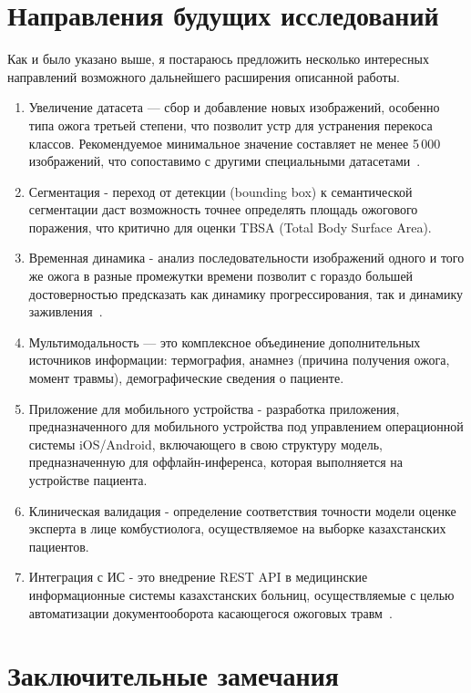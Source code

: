 \section{Направления будущих исследований}

Как и было указано выше, я постараюсь предложить несколько интересных направлений возможного дальнейшего расширения описанной работы.

\begin{enumerate}
\item Увеличение датасета --- сбор и добавление новых изображений, особенно типа ожога третьей степени, что позволит устр для устранения перекоса классов. Рекомендуемое минимальное значение составляет не менее 5\,000 изображений, что сопоставимо с другими специальными датасетами~\cite{esteva2017dermatologist}. \item Сегментация - переход от детекции (bounding box) к семантической сегментации даст возможность точнее определять площадь ожогового поражения, что критично для оценки TBSA (Total Body Surface Area). \item Временная динамика - анализ последовательности изображений одного и того же ожога в разные промежутки времени позволит с гораздо большей достоверностью предсказать как динамику прогрессирования, так и динамику заживления~\cite{hoeksema2009accuracy}. \item Мультимодальность --- это комплексное объединение дополнительных источников информации: термография, анамнез (причина получения ожога, момент травмы), демографические сведения о пациенте. \item Приложение для мобильного устройства - разработка приложения, предназначенного для мобильного устройства под управлением операционной системы iOS/Android, включающего в свою структуру модель, предназначенную для оффлайн-инференса, которая выполняется на устройстве пациента.

\item Клиническая валидация - определение соответствия точности модели оценке эксперта в лице комбустиолога, осуществляемое на выборке казахстанских пациентов.
\item Интеграция с ИС - это внедрение REST API в медицинские информационные системы казахстанских больниц, осуществляемые с целью автоматизации документооборота касающегося ожоговых травм~\cite{litestar2023}. \end{enumerate}

\section{Заключительные замечания}

